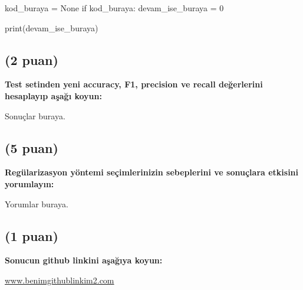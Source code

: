 \documentclass[11pt]{article}
\begin{document}
\begin{python}
kod_buraya = None
if kod_buraya:
    devam_ise_buraya = 0

print(devam_ise_buraya)
\end{python}

\subsection{(2 puan)} \textbf{Test setinden yeni accuracy, F1, precision ve recall değerlerini hesaplayıp aşağı koyun:}

Sonuçlar buraya.

\subsection{(5 puan)} \textbf{Regülarizasyon yöntemi seçimlerinizin sebeplerini ve sonuçlara etkisini yorumlayın:}

Yorumlar buraya.

\subsection{(1 puan)} \textbf{Sonucun github linkini  aşağıya koyun:}

\url{www.benimgithublinkim2.com}
\end{document}

